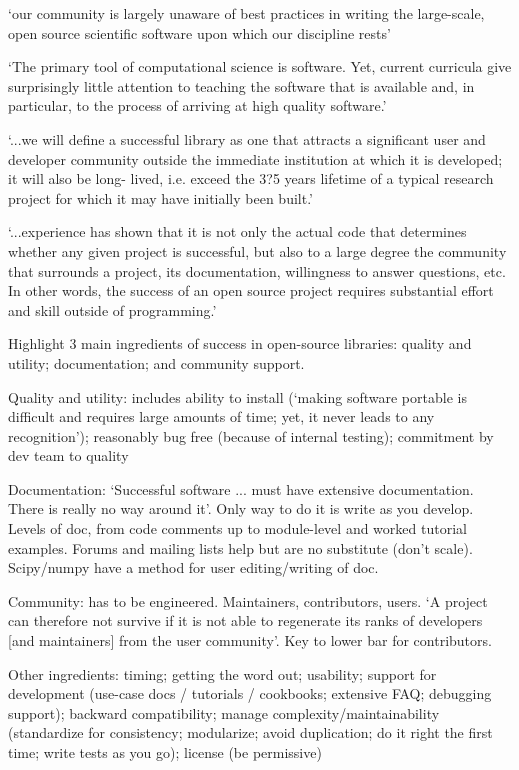\documentclass[12pt]{amsart}
\begin{document}
`our community is largely unaware of best practices in writing the large-scale, open source scientific software upon which our discipline rests'

`The primary tool of computational science is software. Yet, current curricula give surprisingly little attention to teaching the software that is available and, in particular, to the process of arriving at high quality software.'

`...we will define a successful library as one that attracts a significant user and developer community outside the immediate institution at which it is developed; it will also be long- lived, i.e. exceed the 3?5 years lifetime of a typical research project for which it may have initially been built.'

`...experience has shown that it is not only the actual code that determines whether any given project is successful, but also to a large degree the community that surrounds a project, its documentation, willingness to answer questions, etc. In other words, the success of an open source project requires substantial effort and skill outside of programming.'

Highlight 3 main ingredients of success in open-source libraries: quality and utility; documentation; and community support.

Quality and utility: includes ability to install (`making software portable is difficult and requires large amounts of time; yet, it never leads to any recognition'); reasonably bug free (because of internal testing); commitment by dev team to quality

Documentation: `Successful software ... must have extensive documentation. There is really no way around it'. Only way to do it is write as you develop. Levels of doc, from code comments up to module-level and worked tutorial examples. Forums and mailing lists help but are no substitute (don't scale). Scipy/numpy have a method for user editing/writing of doc.

Community: has to be engineered. Maintainers, contributors, users. `A project can therefore not survive if it is not able to regenerate its ranks of developers [and maintainers] from the user community'. Key to lower bar for contributors. 

Other ingredients: timing; getting the word out; usability; support for development (use-case docs / tutorials / cookbooks; extensive FAQ; debugging support); backward compatibility; manage complexity/maintainability (standardize for consistency; modularize; avoid duplication; do it right the first time; write tests as you go); license (be permissive)
\end{document}
